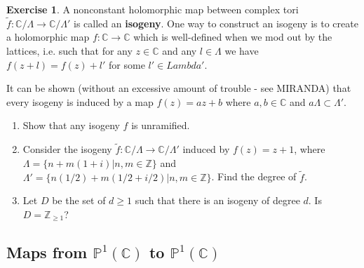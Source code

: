 \documentclass[12pt]{book}%
\theoremstyle{plain}
\theoremstyle{definition}
\newtheorem{exercise}{Exercise}
\theoremstyle{remark}
\def\to{\rightarrow}
\def\bC{{\mathbb{C}}}
\def\bZ{{\mathbb{Z}}}
\newcommand{\PoneC}{{\mathbb P}^1({\mathbb C})}
\begin{document}
\begin{exercise}
A nonconstant holomorphic map between complex tori $\tilde{f}: \bC/\Lambda \to \bC/\Lambda'$ is called an \textbf{isogeny}. One way to construct an isogeny is to create a holomorphic map $f:\bC \to \bC$ which is well-defined when we mod out by the lattices, i.e. such that for any $z \in \bC$ and any $l \in \Lambda$ we have $f(z+l) = f(z) + l'$ for some $l' \in Lambda'$.

It can be shown (without an excessive amount of trouble - see MIRANDA) that every isogeny is induced by a map $f(z) = az+b$ where $a,b \in \bC$ and $a\Lambda \subset \Lambda'$.

\begin{enumerate}
\item Show that any isogeny $f$ is unramified.

\item Consider the isogeny $\tilde{f}:\bC/\Lambda \to \bC/\Lambda'$ induced by $f(z) = z+1$, where $\Lambda = \{n+m(1+i)|n,m \in \bZ\}$ and $\Lambda' = \{n(1/2)+m(1/2+i/2)|n,m \in \bZ\}$. Find the degree of $\tilde{f}$.

\item Let $D$ be the set of $d \geq 1$ such that there is an isogeny of degree $d$. Is $D = \bZ_{\geq 1}$?
\end{enumerate}
\end{exercise}



\subsection{Maps from $\PoneC$ to $\PoneC$}
\end{document}
